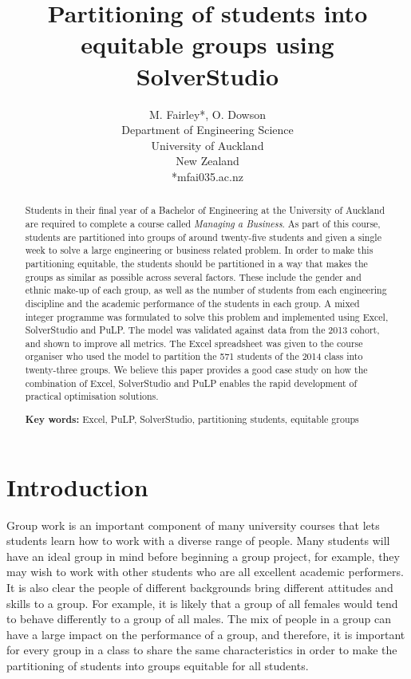 \documentclass[12pt]{ORSNZ}
\title{Partitioning of students into equitable groups using SolverStudio}
\author{M. Fairley*, O. Dowson\\Department of Engineering Science\\University of
  Auckland\\New Zealand\\{*}mfai035\@@aucklanduni.ac.nz}
\date{} %
\begin{document}
\maketitle
\pagestyle{empty} \thispagestyle{empty}
\begin{abstract}
Students in their final year of a Bachelor of Engineering at the University of Auckland are required to complete a course called \emph{Managing a Business}. As part of this course, students are partitioned into groups of around twenty-five students and given a single week to solve a large engineering or business related problem. In order to make this partitioning equitable, the students should be partitioned in a way that makes the groups as similar as possible across several factors. These include the gender and ethnic make-up of each group, as well as the number of students from each engineering discipline and the academic performance of the students in each group. A mixed integer programme was formulated to solve this problem and implemented using Excel, SolverStudio and PuLP. The model was validated against data from the 2013 cohort, and shown to improve all metrics. The Excel spreadsheet was given to the course organiser who used the model to partition the 571 students of the 2014 class into twenty-three groups. We believe this paper provides a good case study on how the combination of Excel, SolverStudio and PuLP enables the rapid development of practical optimisation solutions.

\textbf{Key words:} Excel, PuLP, SolverStudio, partitioning students, equitable groups
\end{abstract}
\section{Introduction}
Group work is an important component of many university courses that lets students learn how to work with a diverse range of people. Many students will have an ideal group in mind before beginning a group project, for example, they may wish to work with other students who are all excellent academic performers. It is also clear the people of different backgrounds bring different attitudes and skills to a group. For example, it is likely that a group of all females would tend to behave differently to a group of all males. The mix of people in a group can have a large impact on the performance of a group, and therefore, it is important for every group in a class to share the same characteristics in order to make the partitioning of students into groups equitable for all students.
\end{document}
